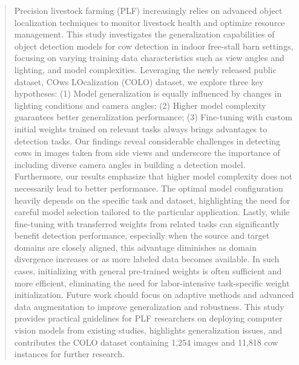 \begin{abstract}

Precision livestock farming (PLF) increasingly relies on advanced object localization techniques to monitor livestock health and optimize resource management. This study investigates the generalization capabilities of object detection models for cow detection in indoor free-stall barn settings, focusing on varying training data characteristics such as view angles and lighting, and model complexities. Leveraging the newly released public dataset, COws LOcalization (COLO) dataset, we explore three key hypotheses: (1) Model generalization is equally influenced by changes in lighting conditions and camera angles; (2) Higher model complexity guarantees better generalization performance; (3) Fine-tuning with custom initial weights trained on relevant tasks always brings advantages to detection tasks. Our findings reveal considerable challenges in detecting cows in images taken from side views and underscore the importance of including diverse camera angles in building a detection model. Furthermore, our results emphasize that higher model complexity does not necessarily lead to better performance. The optimal model configuration heavily depends on the specific task and dataset, highlighting the need for careful model selection tailored to the particular application. Lastly, while fine-tuning with transferred weights from related tasks can significantly benefit detection performance, especially when the source and target domains are closely aligned, this advantage diminishes as domain divergence increases or as more labeled data becomes available. In such cases, initializing with general pre-trained weights is often sufficient and more efficient, eliminating the need for labor-intensive task-specific weight initialization. Future work should focus on adaptive methods and advanced data augmentation to improve generalization and robustness. This study provides practical guidelines for PLF researchers on deploying computer vision models from existing studies, highlights generalization issues, and contributes the COLO dataset containing 1,254 images and 11,818 cow instances for further research.

\end{abstract}

